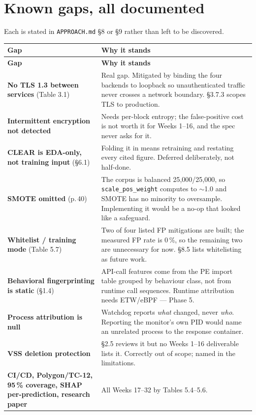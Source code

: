 \documentclass[11pt,a4paper]{article}
\begin{document}
\section{Known gaps, all documented}

Each is stated in \texttt{APPROACH.md} \S8 or \S9 rather than left to be discovered.

\begin{xltabular}{\linewidth}{@{}Y{0.62}Y{1.38}@{}}
\toprule
\textbf{Gap} & \textbf{Why it stands} \\
\midrule
\endfirsthead
\toprule
\textbf{Gap} & \textbf{Why it stands} \\
\midrule
\endhead
\bottomrule
\endfoot

\textbf{No TLS 1.3 between services} (Table 3.1)
  & Real gap. Mitigated by binding the four backends to loopback so unauthenticated
    traffic never crosses a network boundary. \S3.7.3 scopes TLS to production. \\

\textbf{Intermittent encryption not detected}
  & Needs per-block entropy; the false-positive cost is not worth it for Weeks 1--16,
    and the spec never asks for it. \\

\textbf{CLEAR is EDA-only, not training input} (\S6.1)
  & Folding it in means retraining and restating every cited figure. Deferred
    deliberately, not half-done. \\

\textbf{SMOTE omitted} (p.\,40)
  & The corpus is balanced 25,000/25,000, so \texttt{scale\_pos\_weight} computes to
    $\sim$1.0 and SMOTE has no minority to oversample. Implementing it would be a
    no-op that looked like a safeguard. \\

\textbf{Whitelist / training mode} (Table 5.7)
  & Two of four listed FP mitigations are built; the measured FP rate is 0\,\%, so the
    remaining two are unnecessary for now. \S8.5 lists whitelisting as future work. \\

\textbf{Behavioral fingerprinting is static} (\S1.4)
  & API-call features come from the PE import table grouped by behaviour class, not
    from runtime call sequences. Runtime attribution needs ETW/eBPF --- Phase 5. \\

\textbf{Process attribution is null}
  & Watchdog reports \emph{what} changed, never \emph{who}. Reporting the monitor's own
    PID would name an unrelated process to the response container. \\

\textbf{VSS deletion protection}
  & \S2.5 reviews it but no Weeks 1--16 deliverable lists it. Correctly out of scope;
    named in the limitations. \\

\textbf{CI/CD, Polygon/TC-12, 95\,\% coverage, SHAP per-prediction, research paper}
  & All Weeks 17--32 by Tables 5.4--5.6. \\
\end{xltabular}
\end{document}
